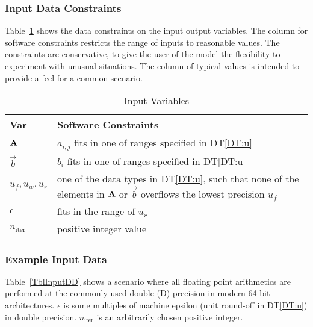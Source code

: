 \documentclass[12pt]{article}
\newcommand{\dtref}[1]{DT\ref{#1}}
\begin{document}

\subsubsection{Input Data Constraints} \label{sec_DataConstraints}

Table~\ref{TblInputVar} shows the data constraints on the input output variables.
The column for software constraints restricts the range of inputs to reasonable
values. The constraints are conservative, to give the user of the model the
flexibility to experiment with unusual situations. The column of typical values
is intended to provide a feel for a common scenario.

\begin{table}[H]
  \caption{Input Variables} \label{TblInputVar}
  \renewcommand{\arraystretch}{1.2}
  \centering
  \begin{tabularx}{.8\linewidth}{lX}
    \toprule
    \textbf{Var}         & \textbf{Software Constraints}                                    \\
    \midrule
    \(\mathbf{A}\)   & \(a_{i,j}\) fits in one of ranges specified in \dtref{DT:u} \\
    \(\vec{b}\)          & \(b_{i}\) fits in one of ranges specified in \dtref{DT:u}   \\
    \(u_f, u_w, u_r\) & one of the data types in \dtref{DT:u}, such that none of the
                     elements in \(\mathbf{A}\) or \(\vec{b}\) overflows the lowest
                     precision \(u_f\)                                           \\
    \(\epsilon\)          & fits in the range of \(u_r\)                                \\
    \(n_\mathrm{iter}\)   & positive integer value                                     \\
    \bottomrule
  \end{tabularx}
\end{table}

\subsubsection{Example Input Data} \label{sec_ExampleInput}

Table~\ref{TblInputDD} shows a scenario where all floating point arithmetics are
performed at the commonly used double (D) precision in modern 64-bit
architectures. \(\epsilon\) is some multiples of machine epsilon (unit round-off
in \dtref{DT:u}) in double precision. \(n_\mathrm{iter}\) is an arbitrarily chosen
positive integer.
\end{document}
